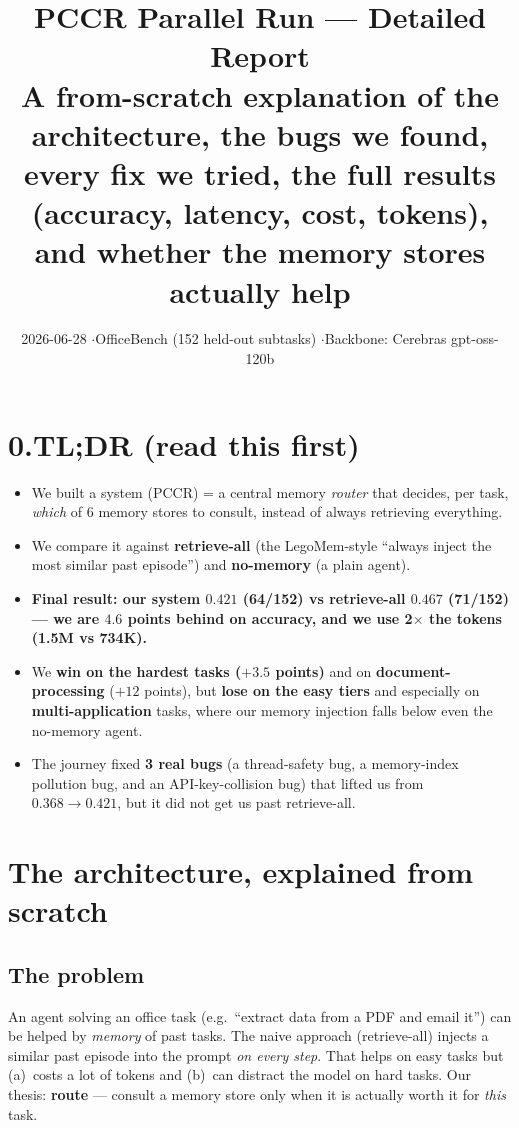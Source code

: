 \documentclass[11pt]{article}
\title{\textbf{PCCR Parallel Run --- Detailed Report}\\[4pt]
\large A from-scratch explanation of the architecture, the bugs we found,\\
every fix we tried, the full results (accuracy, latency, cost, tokens),\\
and whether the memory stores actually help}
\author{}
\date{2026-06-28 \quad$\cdot$\quad OfficeBench (152 held-out subtasks) \quad$\cdot$\quad Backbone: Cerebras gpt-oss-120b}
\begin{document}
\maketitle

\section*{0.\quad TL;DR (read this first)}
\begin{itemize}[leftmargin=1.4em,itemsep=2pt]
\item We built a system (PCCR) = a central memory \emph{router} that decides, per task, \emph{which} of
6 memory stores to consult, instead of always retrieving everything.
\item We compare it against \textbf{retrieve-all} (the LegoMem-style ``always inject the most similar past
episode'') and \textbf{no-memory} (a plain agent).
\item \textbf{Final result: our system $0.421$ (64/152) vs retrieve-all $0.467$ (71/152) --- we are $4.6$
points behind on accuracy, and we use 2$\times$ the tokens (1.5M vs 734K).}
\item We \textbf{win on the hardest tasks ($+3.5$ points)} and on \textbf{document-processing} ($+12$
points), but \textbf{lose on the easy tiers} and especially on \textbf{multi-application} tasks, where our
memory injection falls below even the no-memory agent.
\item The journey fixed \textbf{3 real bugs} (a thread-safety bug, a memory-index pollution bug, and an
API-key-collision bug) that lifted us from $0.368 \to 0.421$, but it did not get us past retrieve-all.
\end{itemize}

\section{The architecture, explained from scratch}

\subsection{The problem}
An agent solving an office task (e.g.\ ``extract data from a PDF and email it'') can be helped by
\emph{memory} of past tasks. The naive approach (retrieve-all) injects a similar past episode into the
prompt \emph{on every step}. That helps on easy tasks but (a)~costs a lot of tokens and (b)~can distract
the model on hard tasks. Our thesis: \textbf{route} --- consult a memory store only when it is actually
worth it for \emph{this} task.
\end{document}
